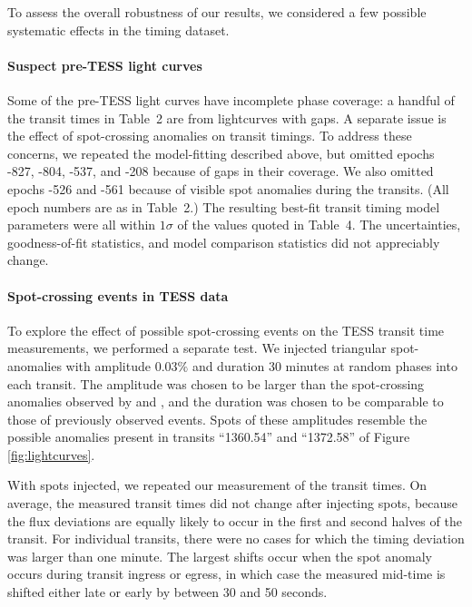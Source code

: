 \documentclass[12pt,twocolumn,tighten]{aastex62}
\begin{document}
To assess the overall robustness of our results, we considered a few
possible systematic effects in the timing dataset.  

\paragraph{Suspect pre-TESS light curves}
Some of the pre-TESS light curves have incomplete phase coverage: a
handful of the transit times in Table~2 are from lightcurves with
gaps.  A separate issue is the effect of spot-crossing anomalies on
transit timings.  To address these concerns, we repeated the
model-fitting described above, but omitted epochs -827, -804, -537,
and -208 because of gaps in their coverage.  We also omitted epochs
-526 and -561 because of visible spot anomalies during the transits.
(All epoch numbers are as in Table~2.)  The resulting best-fit transit
timing model parameters were all within $1\sigma$ of the values quoted
in Table~4.  The uncertainties, goodness-of-fit statistics, and model
comparison statistics did not appreciably change.

\paragraph{Spot-crossing events in TESS data}
To explore the effect of possible spot-crossing events on the TESS
transit time measurements, we performed a separate test.  We injected
triangular spot-anomalies with amplitude $0.03\%$ and duration 30
minutes at random phases into each transit.  The amplitude was chosen
to be larger than the spot-crossing anomalies observed by
\citet{southworth_high-precision_2009} and
\citet{sanchis-ojeda_starspots_2011}, and the duration was chosen to
be comparable to those of previously observed events.  Spots of these
amplitudes resemble the possible anomalies present in transits
``1360.54'' and ``1372.58'' of Figure \ref{fig:lightcurves}.

With spots injected, we repeated our measurement of the transit times.
On average, the measured transit times did not change after injecting
spots, because the flux deviations are equally likely to occur in the
first and second halves of the transit.  For individual transits,
there were no cases for which the timing deviation was larger than one
minute.  The largest shifts occur when the spot anomaly occurs during
transit ingress or egress, in which case the measured mid-time is
shifted either late or early by between 30 and 50 seconds.
\end{document}
